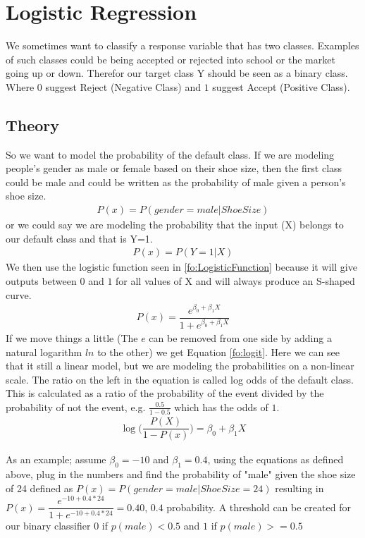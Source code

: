 \section{Logistic Regression}\label{sc:logisticRegression}
We sometimes want to classify a response variable that has two classes. Examples of such classes could be being accepted or rejected into school or the market going up or down. Therefor our target class Y should be seen as a binary class. Where $0$ suggest Reject (Negative Class) and $1$ suggest Accept (Positive Class).
\subsection{Theory}
So we want to model the probability of the default class. If we are modeling people’s gender as male or female based on their shoe size, then the first class could be male and could be written as the probability of male given a person’s shoe size.
\begin{align}
P(x) = P(gender=male|ShoeSize)
\end{align}
or we could say we are modeling the probability that the input (X) belongs to our default class and that is Y=1.
\begin{align}\label{fo:probability}
P(x) = P(Y=1|X)
\end{align}
We then use the logistic function seen in \ref{fo:LogisticFunction} because it will give outputs between $0$ and $1$ for all values of X and will always produce an S-shaped curve.%
\begin{align}\label{fo:LogisticFunction}
P(x) = \dfrac{ e^{\beta_0 + \beta_1 X}}{  1 + e^{\beta_0 + \beta_1 X}}
\end{align}
If we move things a little (The $e$ can be removed from one side by adding a natural logarithm $ln$ to the other) we get Equation \ref{fo:logit}. Here we can see that it still a linear model, but we are modeling the probabilities on a non-linear scale. The ratio on the left in the equation is called log odds of the default class. This is calculated as a ratio of the probability of the event divided by the probability of not the event, e.g. $\frac{0.5}{1-0.5}$ which has the odds of $1$.
 \begin{align}\label{fo:logit}
\log\bigg( \dfrac{ P(X)}{1-P(x)} \bigg) = \beta_0 + \beta_1 X
\end{align}

As an example; assume $\beta_0 = -10 $ and $ \beta_1 = 0.4 $, using the equations as defined above, plug in the numbers and find the probability of "male" given the shoe size of 24 defined as $P(x) = P(gender=male|ShoeSize=24)$ resulting in $P(x) = \dfrac{ e^{-10 + 0.4*24}}{1 + e^{-10 + 0.4*24}} = 0.40$, $0.4$ probability. A threshold can be created for our binary classifier $0$ if $p(male) < 0.5$ and $1$ if $ p(male) >= 0.5$

